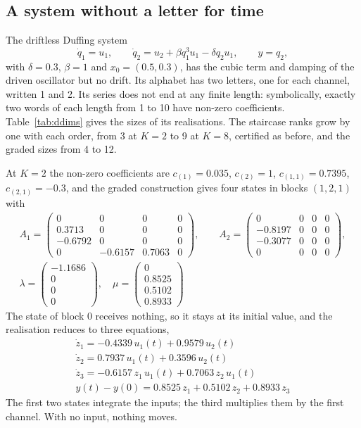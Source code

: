 \documentclass[11pt,a4paper]{article}
\theoremstyle{remark}
\begin{document}
\subsection{A system without a letter for time}\label{sec:dduffing}
The driftless Duffing system
\begin{equation}\label{eq:dduffing}
\dot q_1=u_1,\qquad \dot q_2=u_2+\beta q_1^3u_1-\delta q_2u_1,\qquad y=q_2,
\end{equation}
with $\delta=0.3$, $\beta=1$ and $x_0=(0.5,0.3)$, has the cubic term and damping of the driven oscillator but no drift.
Its alphabet has two letters, one for each channel, written 1 and 2.
Its series does not end at any finite length: symbolically, exactly two words of each length from 1 to 10 have non-zero coefficients.
Table~\ref{tab:ddims} gives the sizes of its realisations.
The staircase ranks grow by one with each order, from 3 at $K=2$ to 9 at $K=8$, certified as before, and the graded sizes from 4 to 12.

At $K=2$ the non-zero coefficients are $c_{(1)}=0.035$, $c_{(2)}=1$, $c_{(1,1)}=0.7395$, $c_{(2,1)}=-0.3$, and the graded construction gives four states in blocks $(1,2,1)$ with
\begin{gather*}
A_1=\begin{pmatrix}0 & 0 & 0 & 0\\0.3713 & 0 & 0 & 0\\-0.6792 & 0 & 0 & 0\\0 & -0.6157 & 0.7063 & 0\end{pmatrix},\qquad A_2=\begin{pmatrix}0 & 0 & 0 & 0\\-0.8197 & 0 & 0 & 0\\-0.3077 & 0 & 0 & 0\\0 & 0 & 0 & 0\end{pmatrix},\\ \lambda=\begin{pmatrix}-1.1686\\0\\0\\0\end{pmatrix},\quad \mu=\begin{pmatrix}0\\0.8525\\0.5102\\0.8933\end{pmatrix}
\end{gather*}
The state of block 0 receives nothing, so it stays at its initial value, and the realisation reduces to three equations,
\begin{gather*}
\dot z_1=-0.4339\,u_1(t) +0.9579\,u_2(t)\\\dot z_2=0.7937\,u_1(t) +0.3596\,u_2(t)\\\dot z_3=-0.6157\,z_1\,u_1(t) +0.7063\,z_2\,u_1(t)\\y(t)-y(0)=0.8525\,z_1 +0.5102\,z_2 +0.8933\,z_3
\end{gather*}
The first two states integrate the inputs; the third multiplies them by the first channel.
With no input, nothing moves.
\end{document}
